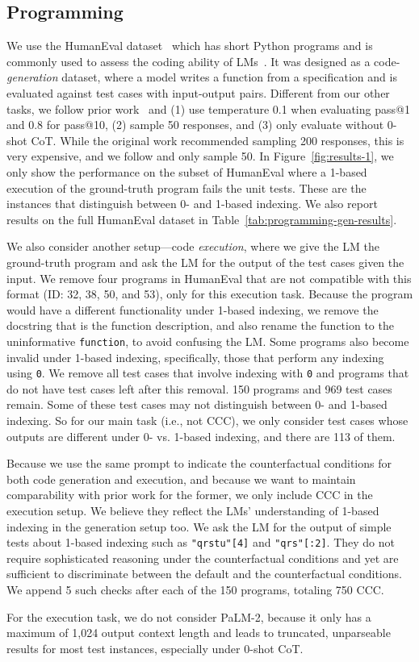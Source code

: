 \subsection{Programming} \label{sec:programming-setup}

We use the HumanEval dataset~\citep{chen2021codex} which has short Python programs and is commonly used to assess the coding ability of LMs~. It was designed as a code-\emph{generation} dataset, where a model writes a function from a specification and is evaluated against test cases with input-output pairs. Different from our other tasks, we follow prior work~\citep{llama,wang2023far} and (1) use temperature 0.1 when evaluating pass@1 and 0.8 for pass@10, (2) sample 50 responses, and (3) only evaluate without 0-shot CoT. While the original work \cite{chen2021codex} recommended sampling 200 responses, this is very expensive, and we follow \citet{wang2023far} and only sample 50.
In Figure~\ref{fig:results-1}, we only show the performance on the subset of HumanEval where a 1-based execution of the ground-truth program fails the unit tests. These are the instances that distinguish between 0- and 1-based indexing. We also report results on the full HumanEval dataset in Table~\ref{tab:programming-gen-results}.

We also consider another setup---code \emph{execution}, where we give the LM the ground-truth program and ask the LM for the output of the test cases given the input. We remove four programs in HumanEval that are not compatible with this format (ID: 32, 38, 50, and 53), only for this execution task.
Because the program would have a different functionality under 1-based indexing, we remove the docstring that is the function description, and also rename the function to the uninformative \texttt{function}, to avoid confusing the LM.
Some programs also become invalid under 1-based indexing, specifically, those that perform any indexing using \texttt{0}. We remove all test cases that involve indexing with \texttt{0} and programs that do not have test cases left after this removal. 150 programs and 969 test cases remain.
Some of these test cases may not distinguish between 0- and 1-based indexing.
So for our main task (i.e., not CCC), we only consider test cases whose outputs are different under 0- vs. 1-based indexing, and there are 113 of them.

Because we use the same prompt to indicate the counterfactual conditions for both code generation and execution, and because we want to maintain comparability with prior work for the former, we only include CCC in the execution setup. We believe they reflect the LMs' understanding of 1-based indexing in the generation setup too.
We ask the LM for the output of simple tests about 1-based indexing such as \texttt{"qrstu"[4]} and \texttt{"qrs"[:2]}. They do not require sophisticated reasoning under the counterfactual conditions and yet are sufficient to discriminate between the default and the counterfactual conditions.
We append  5 such checks after each of the 150 programs, totaling 750 CCC.

For the execution task, we do not consider PaLM-2, because it only has a maximum of 1,024 output context length and leads to truncated, unparseable results for most test instances, especially under 0-shot CoT.
